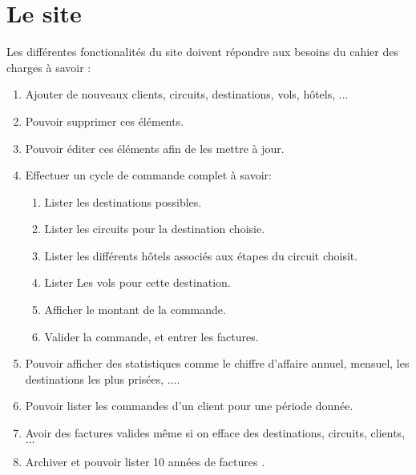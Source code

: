 \section{Le site}
Les diff\'erentes fonctionalit\'es du site doivent r\'epondre aux besoins du cahier des charges \`a savoir :

\begin{enumerate}[$\bullet$]
\item Ajouter de nouveaux clients, circuits, destinations, vols, h\^otels, ...
\item Pouvoir supprimer ces \'el\'ements.
\item Pouvoir \'editer ces \'el\'ements afin de les mettre \`a jour.
\item Effectuer un cycle de commande complet \`a savoir:
\begin{enumerate}[$\bullet$]
\item Lister les destinations possibles.
\item Lister les circuits pour la destination choisie.
\item Lister les diff\'erents h\^otels associ\'es aux \'etapes du circuit choisit.
\item Lister Les vols pour cette destination.
\item Afficher le montant de la commande.
\item Valider la commande, et entrer les factures.
\end{enumerate}

\item Pouvoir afficher des statistiques comme le chiffre d'affaire annuel, mensuel, les destinations les plus pris\'ees, $\ldots$.
\item Pouvoir lister les commandes d'un client pour une p\'eriode donn\'ee.
\item Avoir des factures valides m\^eme si on efface des destinations, circuits, clients, $\ldots$
\item Archiver et pouvoir lister 10 ann\'ees de factures .
\end{enumerate}